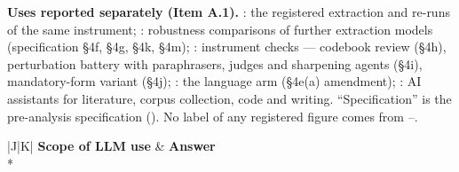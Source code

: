 \documentclass[12pt]{article}
\begin{document}
{\footnotesize
\setlength{\tabcolsep}{3pt}
\renewcommand{\arraystretch}{1.0}

\noindent\textbf{Uses reported separately (Item A.1).} : the registered extraction and re-runs of the same instrument; : robustness comparisons of further extraction models (specification \S4f, \S4g, \S4k, \S4m); : instrument checks --- codebook review (\S4h), perturbation battery with paraphrasers, judges and sharpening agents (\S4i), mandatory-form variant (\S4j); : the language arm (\S4e(a) amendment); : AI assistants for literature, corpus collection, code and writing. ``Specification'' is the pre-analysis specification (). No label of any registered figure comes from --.

\begin{longtable}{|J|K|}
\hline
{}
\textbf{Scope of LLM use} & \textbf{Answer} \\*


\end{longtable}}
\end{document}

